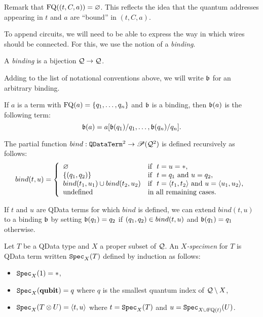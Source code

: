 \documentclass[twoside]{article}
\begin{document}
Remark that $\mathop{\textrm{FQ}}\nolimits((t,C,a))=\varnothing$. This reflects the idea that the 
quantum addresses appearing in $t$ and $a$ are ``bound'' in $(t,C,a)$. 

To append circuits, we will need to be able to express the way in 
which wires should be connected. For this, we use the notion of a 
\emph{binding}.

\begin{definition}
A \emph{binding} is a bijection $\mathcal{Q}\to \mathcal{Q}$.
\end{definition}


Adding to the list of notational conventions above, we will write 
$\mathfrak{b}$ for an arbitrary binding. 

\begin{definition}
If $a$ is a term with $\mathop{\textrm{FQ}}\nolimits(a)=\{q_1,\ldots,q_n\}$ and $\mathfrak{b}$ is 
a binding, then $\mathfrak{b}(a)$ is the following term:
\[
\mathfrak{b}(a)= a[\mathfrak{b}(q_1)/q_1,\ldots ,\mathfrak{b}(q_n)/q_n].
\]
\end{definition}

\begin{definition}
The partial function $bind: \texttt{QDataTerm}^2\to {\mathscr{P}} (\mathcal{Q}^2)$ is 
defined recursively as follows:
\[
bind (t,u)= \left\{
  \begin{array}{ll}
    \varnothing & \mbox{if}~~ t=u=*, \\
    \{(q_1,q_2)\} & \mbox{if}~~ t=q_1 \mbox{ and } u=q_2, \\        
    bind (t_1,u_1) \cup bind (t_2,u_2) & 
      \mbox{if}~~ t=\langle t_1,t_2\rangle \mbox{ and } u=\langle u_1,u_2\rangle, \\
    \mbox{undefined} & \mbox{in all remaining cases.}
  \end{array}
\right.
\]
\end{definition}

\begin{remark}
\label{bind_extension}
If $t$ and $u$ are QData terms for which $bind$ is defined, we 
can extend $bind(t,u)$ to a binding $\mathfrak{b}$ by setting 
$\mathfrak{b} (q_1) = q_2$ if $(q_1,q_2)\in bind (t,u)$ and 
$\mathfrak{b} (q_1) = q_1$ otherwise.
\end{remark}

\begin{definition}
Let $T$ be a QData type and $X$ a proper subset of $\mathcal{Q}$. 
An \emph{$X$-specimen} for $T$ is QData term written $\texttt{Spec}_X(T)$ 
defined by induction as follows:
\begin{itemize}
  \item $\texttt{Spec}_X(1)=*$,
  \item $\texttt{Spec}_X(\textrm{\bf qubit})=q$ where $q$ is the smallest quantum 
  index of $\mathcal{Q}\setminus X$,
  \item $\texttt{Spec}_X(T\otimes U)=\langle t,u\rangle$ where $t=\texttt{Spec}_X(T)$ 
  and $u=\texttt{Spec}_{X\cup \mathop{\textrm{FQ}}\nolimits(t)}(U)$.  
\end{itemize}
\end{definition}
\end{document}
